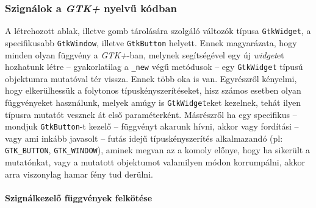 \subsubsection{Szignálok a \textit{GTK+} nyelvű kódban}

\begin{description}
 \item[\ref{gtksignalc:widgetcreatebegin} - \ref{gtksignalc:widgetcreateend} sor] A létrehozott ablak, illetve gomb tárolására szolgáló változók típusa \texttt{GtkWidget}, a specifikusabb \texttt{GtkWindow}, illetve \texttt{GtkButton} helyett. Ennek magyarázata, hogy minden olyan függvény a \textit{GTK+}-ban, melynek segítségével egy új \textit{widget}et hozhatunk létre -- gyakorlatilag a \texttt{\_new} végű metódusok -- egy \texttt{GtkWidget} típusú objektumra mutatóval tér vissza. Ennek több oka is van. Egyrészről kényelmi, hogy elkerülhessük a folytonos típuskényszerítéseket, hisz számos esetben olyan függvényeket használunk, melyek amúgy is \texttt{GtkWidget}eket kezelnek, tehát ilyen típusra mutatót vesznek át első paraméterként. Másrészről ha egy specifikus -- mondjuk \texttt{GtkButton}-t kezelő -- függvényt akarunk hívni, akkor vagy fordítási -- vagy ami inkább javasolt -- futás idejű típuskényszerítés alkalmazandó (pl: \texttt{GTK\_BUTTON}, \texttt{GTK\_WINDOW}), aminek megvan az a komoly előnye, hogy ha sikerült a mutatónkat, vagy a mutatott objektumot valamilyen módon korrumpálni, akkor arra viszonylag hamar fény tud derülni.
\end{description}

\paragraph{Szignálkezelő függvények felkötése}

